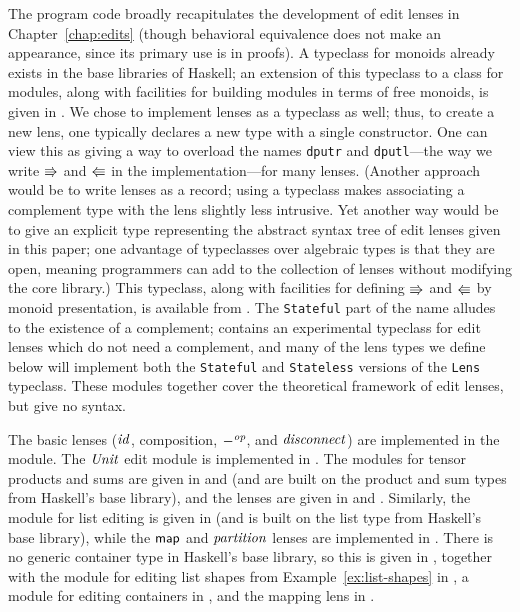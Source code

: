 The program code broadly recapitulates the development of edit lenses in
Chapter~\ref{chap:edits} (though behavioral equivalence does not make an
appearance, since its primary use is in proofs). A typeclass for monoids
already exists in the base libraries of Haskell; an extension of this
typeclass to a class for modules, along with facilities for building modules
in terms of free monoids, is given in . We chose
to implement lenses as a typeclass as well; thus, to create a new lens, one
typically declares a new type with a single constructor. One can view this
as giving a way to overload the names \texttt{dputr} and
\texttt{dputl}---the way we write $\mathord{\Rrightarrow}$ and $\mathord{\Lleftarrow}$ in the
implementation---for many lenses. (Another approach would be to write lenses
as a record; using a typeclass makes associating a complement type with the
lens slightly less intrusive. Yet another way would be to give an explicit
type representing the abstract syntax tree of edit lenses given in this
paper; one advantage of typeclasses over algebraic types is that they are
open, meaning programmers can add to the collection of lenses without
modifying the core library.) This typeclass, along with facilities for
defining $\mathord{\Rrightarrow}$ and $\mathord{\Lleftarrow}$ by monoid presentation, is available from
. The \texttt{Stateful} part of the name
alludes to the existence of a complement; 
contains an experimental typeclass for edit lenses which do not need a
complement, and many of the lens types we define below will implement both
the \texttt{Stateful} and \texttt{Stateless} versions of the \texttt{Lens}
typeclass. These modules together cover the theoretical framework of edit
lenses, but give no syntax.

The basic lenses ($\mathit{id}$, composition, $-^\mathit{op}$, and $\mathit{disconnect}$) are
implemented in the  module. The $\mathit{Unit}$
edit module is implemented in . The modules
for tensor products and sums are given in  and
 (and are built on the product and sum types from
Haskell's base library), and the lenses are given in
 and . Similarly,
the module for list editing is given in  (and is
built on the list type from Haskell's base library), while the $\mathsf{map}$ and
$\mathit{partition}$ lenses are implemented in . There
is no generic container type in Haskell's base library, so this is given in
, together with the module for editing list shapes
from Example~\ref{ex:list-shapes} in , a module
for editing containers in , and the mapping
lens in .

